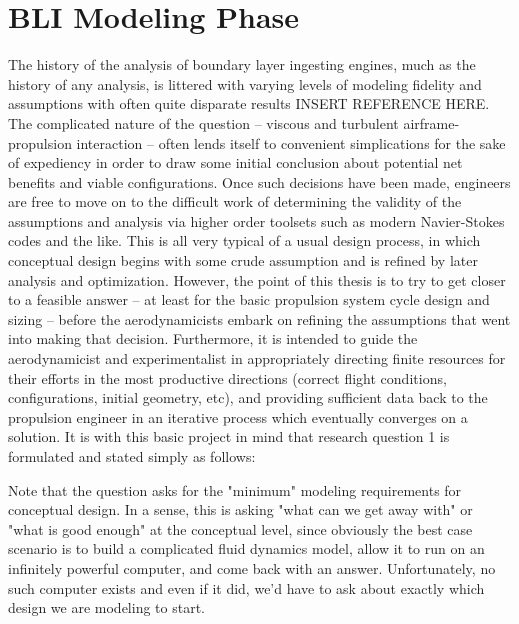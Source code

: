 \documentclass[12pt]{gatech-thesis}
\begin{document}
\section{BLI Modeling Phase}
The history of the analysis of boundary layer ingesting engines, much as the history of any analysis, is littered with varying levels of modeling fidelity and assumptions with often quite disparate results INSERT REFERENCE HERE.  The complicated nature of the question -- viscous and turbulent airframe-propulsion interaction -- often lends itself to convenient simplications for the sake of expediency in order to draw some initial conclusion about potential net benefits and viable configurations.  Once such decisions have been made, engineers are free to move on to the difficult work of determining the validity of the assumptions and analysis via higher order toolsets such as modern Navier-Stokes codes and the like.  This is all very typical of a usual design process, in which conceptual design begins with some crude assumption and is refined by later analysis and optimization.  However, the point of this thesis is to try to get closer to a feasible answer -- at least for the basic propulsion system cycle design and sizing -- before the aerodynamicists embark on refining the assumptions that went into making that decision.  Furthermore, it is intended to guide the aerodynamicist and experimentalist in appropriately directing finite resources for their efforts in the most productive directions (correct flight conditions, configurations, initial geometry, etc), and providing sufficient data back to the propulsion engineer in an iterative process which eventually converges on a solution.  It is with this basic project in mind that research question 1 is formulated and stated simply as follows:
\vspace{25pt}
\vspace{5mm}
\vspace{5mm}

Note that the question asks for the "minimum" modeling requirements for conceptual design.  In a sense, this is asking "what can we get away with" or "what is good enough" at the conceptual level, since obviously the best case scenario is to build a complicated fluid dynamics model, allow it to run on an infinitely powerful computer, and come back with an answer.  Unfortunately, no such computer exists and even if it did, we'd have to ask about exactly which design we are modeling to start.
\end{document}
